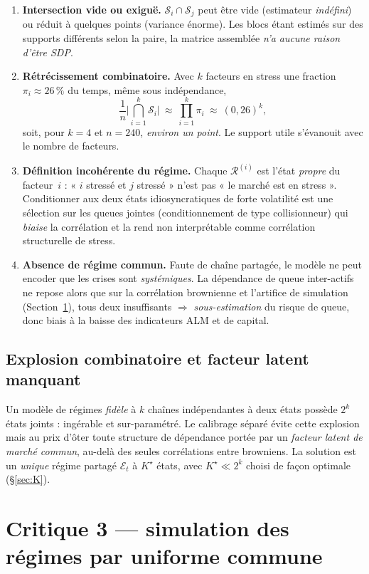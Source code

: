 \documentclass[11pt,a4paper]{article}
\theoremstyle{definition}
\newcommand{\Ecal}{\mathcal{E}}
\newcommand{\Scal}{\mathcal{S}}
\newcommand{\Rcal}{\mathcal{R}}
\begin{document}
\begin{enumerate}
\item \textbf{Intersection vide ou exiguë.} $\Scal_i\cap\Scal_j$ peut être vide (estimateur \emph{indéfini}) ou réduit à quelques points (variance énorme). Les blocs étant estimés sur des supports différents selon la paire, la matrice assemblée \emph{n'a aucune raison d'être SDP}.
\item \textbf{Rétrécissement combinatoire.} Avec $k$ facteurs en stress une fraction $\pi_i\approx 26\,\%$ du temps, même sous indépendance,
\[
\frac{1}{n}\Big|\bigcap_{i=1}^k \Scal_i\Big|\ \approx\ \prod_{i=1}^k \pi_i\ \approx\ (0{,}26)^k,
\]
soit, pour $k=4$ et $n=240$, \emph{environ un point}. Le support utile s'évanouit avec le nombre de facteurs.
\item \textbf{Définition incohérente du régime.} Chaque $\Rcal^{(i)}$ est l'état \emph{propre} du facteur~$i$ : « $i$ stressé et $j$ stressé » n'est pas « le marché est en stress ». Conditionner aux deux états idiosyncratiques de forte volatilité est une sélection sur les queues jointes (conditionnement de type collisionneur) qui \emph{biaise} la corrélation et la rend non interprétable comme corrélation structurelle de stress.
\item \textbf{Absence de régime commun.} Faute de chaîne partagée, le modèle ne peut encoder que les crises sont \emph{systémiques}. La dépendance de queue inter-actifs ne repose alors que sur la corrélation brownienne et l'artifice de simulation (Section~\ref{sec:crit3}), tous deux insuffisants $\Rightarrow$ \emph{sous-estimation} du risque de queue, donc biais à la baisse des indicateurs ALM et de capital.
\end{enumerate}

\subsection{Explosion combinatoire et facteur latent manquant}

Un modèle de régimes \emph{fidèle} à $k$ chaînes indépendantes à deux états possède $2^k$ états joints : ingérable et sur-paramétré. Le calibrage séparé évite cette explosion mais au prix d'ôter toute structure de dépendance portée par un \emph{facteur latent de marché commun}, au-delà des seules corrélations entre browniens. La solution est un \emph{unique} régime partagé $\Ecal_t$ à $K^\star$ états, avec $K^\star\ll 2^k$ choisi de façon optimale (\S\ref{sec:K}).

\section{Critique 3 --- simulation des régimes par uniforme commune}
\label{sec:crit3}
\end{document}
